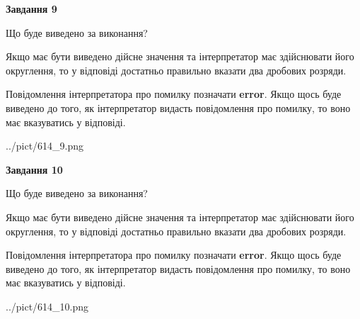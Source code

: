 \documentclass[12pt, ukrainian]{article}
\begin{document}
{\begin {Large}
{\begin {center}\textbf{Завдання 9}\end {center}}\par
Що буде виведено за виконання? \par

Якщо має бути виведено дійсне значення та інтерпретатор має здійснювати його округлення, 
то у відповіді достатньо правильно вказати два дробових розряди.

Повідомлення інтерпретатора про помилку позначати \textbf{error}.
Якщо щось буде виведено до того, як інтерпретатор видасть повідомлення про помилку, 
то воно має вказуватись у відповіді. \par

\begin{center}
	{../pict/614_9.png}
\end{center}
\newpage

{\begin {center}\textbf{Завдання 10}\end {center}}\par
Що буде виведено за виконання? \par

Якщо має бути виведено дійсне значення та інтерпретатор має здійснювати його округлення, 
то у відповіді достатньо правильно вказати два дробових розряди.

Повідомлення інтерпретатора про помилку позначати \textbf{error}.
Якщо щось буде виведено до того, як інтерпретатор видасть повідомлення про помилку, 
то воно має вказуватись у відповіді. \par

\begin{center}
	{../pict/614_10.png}
\end{center}
\newpage

\end {Large}}
\end{document}
